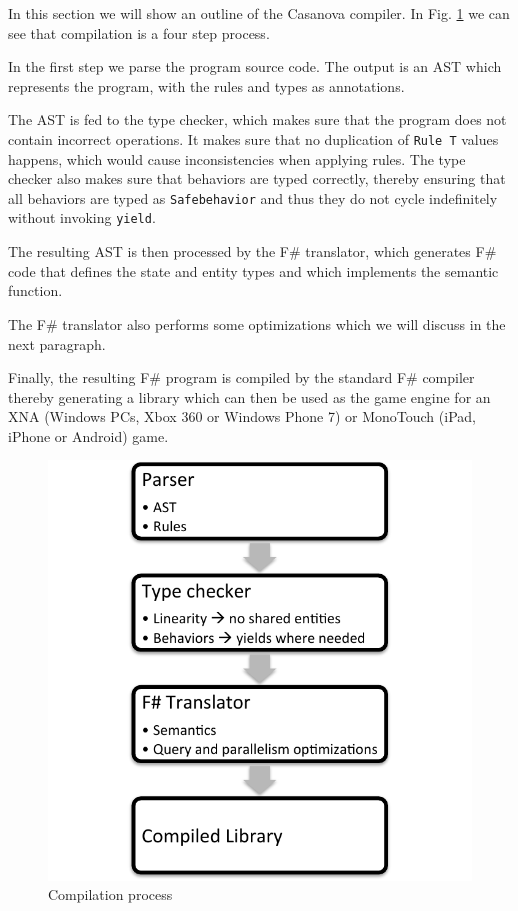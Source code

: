
In this section we will show an outline of the Casanova compiler. In Fig. \ref{fig:compilation_process} we can see that compilation is a four step process.

In the first step we parse the program source code. The output is an AST which represents the program, with the rules and types as annotations.

The AST is fed to the type checker, which makes sure that the program does not contain incorrect operations. It makes sure that no duplication of \texttt{Rule T} values happens, which would cause inconsistencies when applying rules. The type checker also makes sure that behaviors are typed correctly, thereby ensuring that all behaviors are typed as \texttt{Safebehavior} and thus they do not cycle indefinitely without invoking \texttt{yield}.

The resulting AST is then processed by the F\# translator, which generates F\# code that defines the state and entity types and which implements the semantic function.

The F\# translator also performs some optimizations which we will discuss in the next paragraph.

Finally, the resulting F\# program is compiled by the standard F\# compiler thereby generating a library which can then be used as the game engine for an XNA (Windows PCs, Xbox 360 or Windows Phone 7) or MonoTouch (iPad, iPhone or Android) game.

\begin{figure}
\begin{center}
\includegraphics[scale=0.75]{compilation_process.pdf}
\end{center}
\caption{Compilation process}
\label{fig:compilation_process}
\end{figure}


